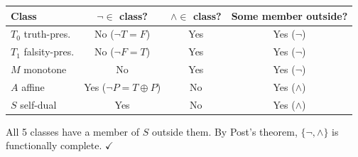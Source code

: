 \begin{example}
\begin{center}
\renewcommand{\arraystretch}{1.3}
\begin{tabular}{lccc}
\toprule
\textbf{Class} & $\neg \in$ class? & $\wedge \in$ class? & \textbf{Some member outside?} \\
\midrule
$T_0$ truth-pres.  & No ($\neg T=F$) & Yes & Yes ($\neg$) \\
$T_1$ falsity-pres.& No ($\neg F=T$) & Yes & Yes ($\neg$) \\
$M$ monotone       & No             & Yes & Yes ($\neg$) \\
$A$ affine         & Yes ($\neg P = T\oplus P$) & No & Yes ($\wedge$) \\
$S$ self-dual      & Yes            & No  & Yes ($\wedge$) \\
\bottomrule
\end{tabular}
\end{center}
All 5 classes have a member of $S$ outside them. By Post's theorem,
$\{\neg,\wedge\}$ is functionally complete. $\checkmark$
\end{example}
